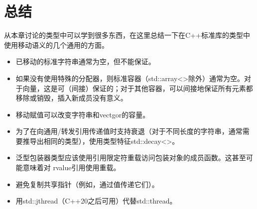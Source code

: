 \section{总结}
从本章讨论的类型中可以学到很多东西，在这里总结一下在C++标准库的类型中使用移动语义的几个通用的方面。

\begin{itemize}
	\item 已移动的标准字符串通常为空，但不能保证。
	\item 如果没有使用特殊的分配器，则标准容器（std::array<>除外）通常为空。对于向量，这是可（间接）保证的；对于其他容器，可以间接地保证所有元素都移除或销毁，插入新成员没有意义。
	\item 移动赋值可以改变字符串和vectgor的容量。
	\item 为了在向通用/转发引用传递值时支持衰退（对于不同长度的字符串，通常需要推导出相同的类型），使用类型特征std::decay<>。
	\item 泛型包装器类型应该使用引用限定符重载访问包装对象的成员函数。这甚至可能意味着对  rvalue引用使用重载。
	\item 避免复制共享指针（例如，通过值传递它们）。
	\item 用std::jthread（C++20之后可用）代替std::thread。
\end{itemize}


